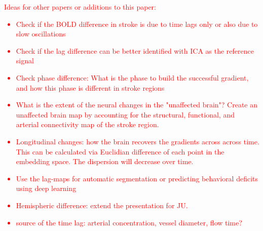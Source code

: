 \documentclass[fleqn,10pt]{wlscirep}
\begin{document}
\textcolor{red}{Ideas for other papers or additions to this paper:
\begin{itemize}
    \item Check if the BOLD difference in stroke is due to time lags only or also due to slow oscillations
    \item Check if the lag difference can be better identified with ICA as the reference signal
    \item Check phase difference: What is the phase to build the successful gradient, and how this phase is different in stroke regions
    \item What is the extent of the neural changes in the "unaffected brain"? Create an unaffected brain map by accounting for the structural, functional, and arterial connectivity map of the stroke region.
    \item Longitudinal changes: how the brain recovers the gradients across across time. This can be calculated via Euclidian difference of each point in the embedding space. The dispersion will decrease over time.
    \item Use the lag-maps for automatic segmentation or predicting behavioral deficits using deep learning
    \item Hemispheric difference: extend the presentation for JU. 
    \item source of the time lag: arterial concentration, vessel diameter, flow time? 
\end{itemize}
}
\end{document}
